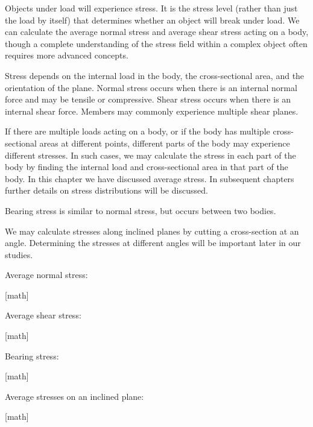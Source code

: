 \documentclass[
  letterpaper,
  DIV=11,
  numbers=noendperiod]{scrreprt}
\begin{document}
\begin{tcolorbox}[enhanced jigsaw, colbacktitle=quarto-callout-note-color!10!white, title={Key takeaways}, coltitle=black, leftrule=.75mm, rightrule=.15mm, opacityback=0, breakable, colframe=quarto-callout-note-color-frame, left=2mm, arc=.35mm, colback=white, bottomrule=.15mm, bottomtitle=1mm, toptitle=1mm, titlerule=0mm, opacitybacktitle=0.6, toprule=.15mm]

Objects under load will experience stress. It is the stress level
(rather than just the load by itself) that determines whether an object
will break under load. We can calculate the average normal stress and
average shear stress acting on a body, though a complete understanding
of the stress field within a complex object often requires more advanced
concepts.

Stress depends on the internal load in the body, the cross-sectional
area, and the orientation of the plane. Normal stress occurs when there
is an internal normal force and may be tensile or compressive. Shear
stress occurs when there is an internal shear force. Members may
commonly experience multiple shear planes.

If there are multiple loads acting on a body, or if the body has
multiple cross-sectional areas at different points, different parts of
the body may experience different stresses. In such cases, we may
calculate the stress in each part of the body by finding the internal
load and cross-sectional area in that part of the body. In this chapter
we have discussed average stress. In subsequent chapters further details
on stress distributions will be discussed.

Bearing stress is similar to normal stress, but occurs between two
bodies.

We may calculate stresses along inclined planes by cutting a
cross-section at an angle. Determining the stresses at different angles
will be important later in our studies.

\end{tcolorbox}

\begin{tcolorbox}[enhanced jigsaw, colbacktitle=quarto-callout-note-color!10!white, title={Key equations}, coltitle=black, leftrule=.75mm, rightrule=.15mm, opacityback=0, breakable, colframe=quarto-callout-note-color-frame, left=2mm, arc=.35mm, colback=white, bottomrule=.15mm, bottomtitle=1mm, toptitle=1mm, titlerule=0mm, opacitybacktitle=0.6, toprule=.15mm]

Average normal stress:

{[}math{]}

Average shear stress:

{[}math{]}

Bearing stress:

{[}math{]}

Average stresses on an inclined plane:

{[}math{]}

\end{tcolorbox}
\end{document}
